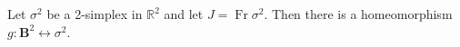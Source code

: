 Let $\sigma^2$ be a 2-simplex in $\mathbb{R}^2$ and let $J = \operatorname{Fr} \sigma^2$. Then there is a homeomorphism $g: \mathbf{B}^2 \leftrightarrow \sigma^2$.
